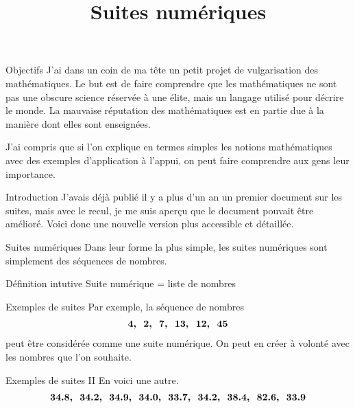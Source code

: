 \documentclass{beamer}
\title{Suites numériques}
\author{}
\date{}
\begin{document}

\begin{frame}
  \titlepage
\end{frame}

\begin{frame}{Objectifs}
  J'ai dans un coin de ma tête un petit projet de vulgarisation des mathématiques. Le but est de faire comprendre que les mathématiques ne sont pas une obscure science réservée à une élite, mais un langage utilisé pour décrire le monde. La mauvaise réputation des mathématiques est en partie due à la manière dont elles sont enseignées.
  
  J'ai compris que si l'on explique en termes simples les notions mathématiques avec des exemples d'application à l'appui, on peut faire comprendre aux gens leur importance.
\end{frame}

\begin{frame}{Introduction}  
  J'avais déjà publié il y a plus d'un an un premier document sur les suites, mais avec le recul, je me suis aperçu que le document pouvait être amélioré. Voici donc une nouvelle version plus accessible et détaillée.
\end{frame}

\begin{frame}{Suites numériques}
  Dans leur forme la plus simple, les suites numériques sont simplement des séquences de nombres.
  \vspace{12pt}
  \begin{block}{Définition intutive}
    Suite numérique = liste de nombres
  \end{block}
\end{frame}

\begin{frame}{Exemples de suites}
  Par exemple, la séquence de nombres
  \begin{align*}
    \footnotesize
    \bm{4,\ \ 2,\ \ 7,\ \ 13,\ \ 12,\ \ 45}
  \end{align*}
  peut être considérée comme une suite numérique. On peut en créer à volonté avec les nombres que l'on souhaite.
\end{frame}

\begin{frame}{Exemples de suites II}
  En voici une autre.
  \begin{align*}
    \footnotesize
    \bm{34.8,\ \ 34.2,\ \ 34.9,\ \ 34.0,\ \ 33.7,\ \ 34.2,\ \ 38.4,\ \ 82.6,\ \ 33.9}
  \end{align*}
\end{frame}
\end{document}
